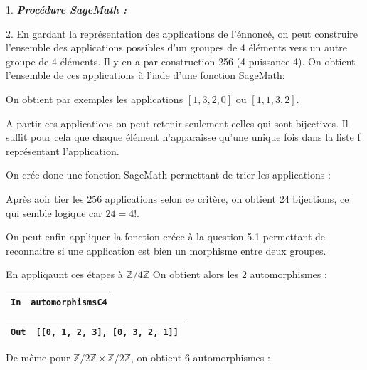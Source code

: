 \documentclass[titlepage]{article}
\begin{document}
    1. \emph{\textbf{Procédure SageMath :}}

    



    2. En gardant la représentation des applications de l'énnoncé, on peut construire l'ensemble des applications possibles d'un groupes de 4 éléments vers un autre groupe de 4 éléments.
    Il y en a par construction 256 (4 puissance 4). On obtient l'ensemble de ces applications à l'iade d'une fonction SageMath:

    

    On obtient par exemples les applications $[1, 3, 2, 0]$ ou $[1, 1, 3, 2]$.

    A partir ces applications on peut retenir seulement celles qui sont bijectives. Il suffit pour cela que chaque élément n'apparaisse qu'une unique fois dans la liste f représentant l'application.

    On crée donc une fonction SageMath permettant de trier les applications :

    

    Après aoir tier les 256 applications selon ce critère, on obtient 24 bijections, ce qui semble logique car $24 = 4!$.

    On peut enfin appliquer la fonction créee à la question 5.1 permettant de reconnaitre si une application est bien un morphisme entre deux groupes.

    En appliqaunt ces étapes à $\mathbb{Z}/4\mathbb{Z}$ On obtient alors les 2 automorphismes :

    \begin{tabularx}{11.5cm}{|p{0.60cm}|X|}
        \hline
        \verb|In|
        & 
        \verb|automorphismsC4|
        \\
        \hline
    \end{tabularx}

    \begin{tabularx}{11.5cm}{|p{0.60cm}|X|}
        \hline
        \verb|Out|
        & 
        \verb|[[0, 1, 2, 3], [0, 3, 2, 1]]|
        \\
        \hline
    \end{tabularx}\newline

    De même pour $\mathbb{Z}/2\mathbb{Z}\times\mathbb{Z}/2\mathbb{Z}$, on obtient 6 automorphismes :
\end{document}
